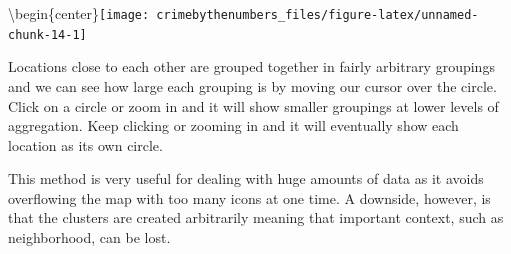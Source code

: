 \documentclass[
  12pt,
  openany]{book}
\newenvironment{Shaded}{\begin{snugshade}}{\end{snugshade}}
\newcommand{\AttributeTok}[1]{\textcolor[rgb]{0.61,0.61,0.61}{#1}}
\newcommand{\DecValTok}[1]{\textcolor[rgb]{0.06,0.06,0.06}{#1}}
\newcommand{\FunctionTok}[1]{\textcolor[rgb]{0,0,0}{#1}}
\newcommand{\NormalTok}[1]{#1}
\newcommand{\SpecialCharTok}[1]{\textcolor[rgb]{0,0,0}{#1}}
\newcommand{\StringTok}[1]{\textcolor[rgb]{0.5,0.5,0.5}{#1}}
\begin{document}
\begin{Shaded}
\end{Shaded}

\textbackslash begin\{center\}\texttt{[image: crimebythenumbers\_files/figure-latex/unnamed-chunk-14-1]}

Locations close to each other are grouped together in fairly arbitrary groupings and we can see how large each grouping is by moving our cursor over the circle. Click on a circle or zoom in and it will show smaller groupings at lower levels of aggregation. Keep clicking or zooming in and it will eventually show each location as its own circle.

This method is very useful for dealing with huge amounts of data as it avoids overflowing the map with too many icons at one time. A downside, however, is that the clusters are created arbitrarily meaning that important context, such as neighborhood, can be lost.
\end{document}

